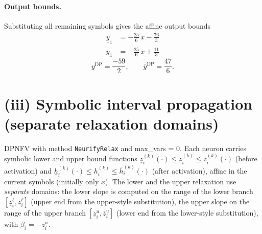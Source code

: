 \documentclass[11pt]{article}
\begin{document}
\paragraph{Output bounds.}
Substituting all remaining symbols gives the affine output bounds
\begin{align*}
\underline{y}_{1} &= -\frac{25}{6}\,x - \frac{76}{3}
\end{align*}
\begin{align*}
\overline{y}_{1} &= -\frac{25}{6}\,x + \frac{11}{3}
\end{align*}
\begin{equation*}
\underline{y}^{\text{DP}} = \frac{-59}{2}, \qquad \overline{y}^{\text{DP}} = \frac{47}{6}.
\end{equation*}

\section{(iii) Symbolic interval propagation (separate relaxation domains)}
DPNFV with method \texttt{NeurifyRelax} and max\_vars = 0. Each neuron carries symbolic lower and upper bound functions
$\underline{z}^{(k)}_i(\cdot) \le z^{(k)}_i \le \overline{z}^{(k)}_i(\cdot)$ (before activation)
and $\underline{h}^{(k)}_i(\cdot) \le h^{(k)}_i \le \overline{h}^{(k)}_i(\cdot)$ (after activation),
affine in the current symbols (initially only $x$).
The lower and the upper relaxation use \emph{separate} domains:
the lower slope is computed on the range of the lower branch
$[\underline{z}^{\ell}_i, \overline{z}^{\ell}_i]$ (upper end from the upper-style substitution),
the upper slope on the range of the upper branch
$[\underline{z}^{u}_i, \overline{z}^{u}_i]$ (lower end from the lower-style substitution),
with $\beta_i = -\underline{z}^{u}_i$.
\end{document}
